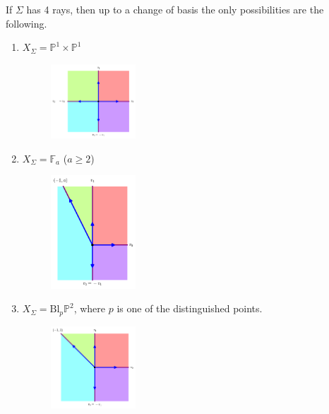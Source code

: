 \documentclass[a4paper,12pt]{amsart}
\newcommand{\PP}{\mathbb{P}}
\begin{document}
\begin{exercise}
	If $\Sigma$ has 4 rays, then up to a change of basis the only possibilities are the following.
	\begin{enumerate}[(1)]
		\item $X_\Sigma=\PP^1\times\PP^1$
		\begin{figure}[h]
			\centering
			\includegraphics[width=0.3\textwidth]{pic/Mar21_fan5}
		\end{figure}
	
	\item $X_\Sigma=\mathbb{F}_a$ ($a\geq 2$)
	\begin{figure}[h]
		\centering
		\includegraphics[width=0.3\textwidth]{pic/Mar21_fan6}
	\end{figure}
\item $X_\Sigma=\text{Bl}_p\PP^2$, where $p$ is one of the distinguished points.
\begin{figure}[h]
	\centering
	\includegraphics[width=0.3\textwidth]{pic/Mar21_fan7}
\end{figure}
	\end{enumerate}
\end{exercise}
\vspace{5cm}
\end{document}
